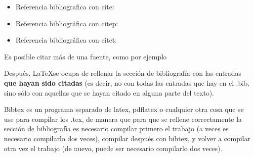 \begin{itemize}
\item Referencia bibliografica con cite: \cite{ldesc2e}
\item Referencia bibliográfica con citep: \citep{notsoshort}
\item Referencia bibliográfica con citet: \citet{latexAPrimer}
\end{itemize}

Es posible citar más de una fuente, como por ejemplo \citep{latexCompanion,LaTeXLamport,texKnuth}

Después, \LaTeX se ocupa de rellenar la sección de bibliografía con las entradas \textbf{que hayan sido citadas} (es decir, no con todas las entradas que hay en el .bib, sino sólo con aquellas que se hayan citado en alguna parte del texto).

Bibtex es un programa separado de latex, pdflatex o cualquier otra cosa que se use para compilar los .tex, de manera que para que se rellene correctamente la sección de bibliografía es necesario compilar primero el trabajo (a veces es necesario compilarlo dos veces), compilar después con bibtex, y volver a compilar otra vez el trabajo (de nuevo, puede ser necesario compilarlo dos veces). 
